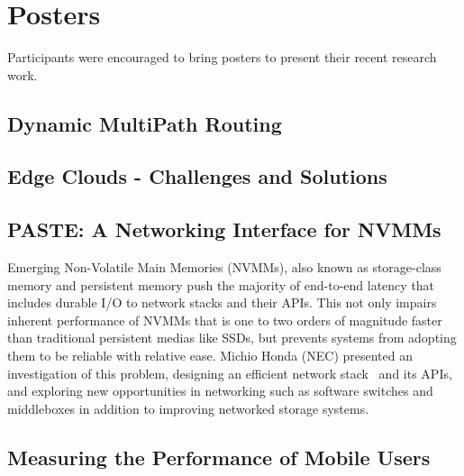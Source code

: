 \section{Posters}\label{sec:posters}

Participants were encouraged to bring posters to present
their recent research work.

\subsection{Dynamic MultiPath Routing}


\subsection{Edge Clouds - Challenges and Solutions}

\subsection{PASTE: A Networking Interface for NVMMs}

Emerging Non-Volatile Main Memories (NVMMs), also known as storage-class
memory and persistent memory  push the majority of end-to-end latency that
includes durable I/O to network stacks and their APIs.  This not only impairs
inherent performance of NVMMs that is one to two orders of magnitude faster
than traditional persistent medias like SSDs, but prevents systems from
adopting them to be reliable with relative ease. Michio Honda (NEC) presented
an investigation of this problem, designing an efficient network
stack~\cite{mhonda:hotnets:2016} and its APIs, and exploring new opportunities
in networking such as software switches and middleboxes in addition to
improving networked storage systems.

\subsection{Measuring the Performance of Mobile Users}

